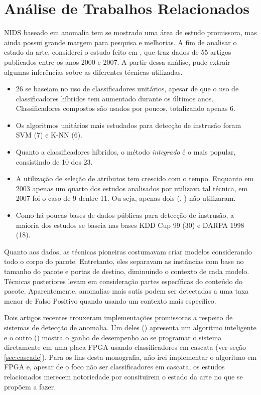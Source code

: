 \chapter{Análise de Trabalhos Relacionados}
\label{ch:analise}

NIDS baseado em anomalia tem se mostrado uma área de estudo promissora, mas ainda possui grande margem para pesquisa e melhorias.
A fim de analisar o estado da arte, considerei o estudo feito em \cite{tsai09}, que traz dados de 55 artigos publicados
entre os anos 2000 e 2007. A partir dessa análise, pude extrair algumas inferências sobre as diferentes técnicas utilizadas.
\begin{itemize}
    \item  26 se baseiam no uso de classificadores unitários, apesar de que o uso de
    classificadores híbridos tem aumentado durante os últimos anos.
    Classificadores compostos são usados por poucos, totalizando apenas 6.

    \item Os algoritmos unitários mais estudados para detecção de instrusão foram SVM (7) e K-NN (6).

    \item Quanto a classificadores híbridos, o método \textit{integrado} é o mais popular, consistindo de 10 dos 23.

    \item A utilização de seleção de atributos tem crescido com o tempo. Enquanto em 2003 apenas um quarto dos estudos analisados
por \cite{tsai09} utilizava tal técnica, em 2007 foi o caso de 9 dentre 11. Ou seja, apenas dois (\cite{peddabachigari07}, \cite{li07}) não utilizaram.

    \item Como há poucas bases de dados públicas para detecção de instrusão, a maioria dos estudos se baseia nas
    bases KDD Cup 99 (30) e DARPA 1998 (18).
\end{itemize}

\par Quanto aos dados, as técnicas pioneiras costumavam criar modelos considerando todo o corpo do pacote. Entretanto,
eles separavam as instâncias com base no tamanho do pacote e portas de destino, diminuindo o contexto de cada modelo.
Técnicas posteriores levam em consideração partes específicas do conteúdo do pacote. Aparentemente, anomalias mais
sutis podem ser detectadas a uma taxa menor de Falso Positivo quando usando um contexto mais específico.
\par Dois artigos recentes trouxeram implementações promissoras a respeito de sistemas de detecção de
anomalia. Um deles (\cite{lin12}) apresenta um algoritmo inteligente e o outro (\cite{papadonikolakis12}) mostra o
ganho de desempenho ao se programar o sistema diretamente em uma placa FPGA usando classificadores em cascata (ver seção \ref{sec:cascade}). Para os fins desta monografia, não irei
implementar o algoritmo em FPGA e, apesar de o foco não ser classificadores em cascata, os estudos relacionados merecem
notoriedade por consituirem o estado da arte no que se propõem a fazer.

